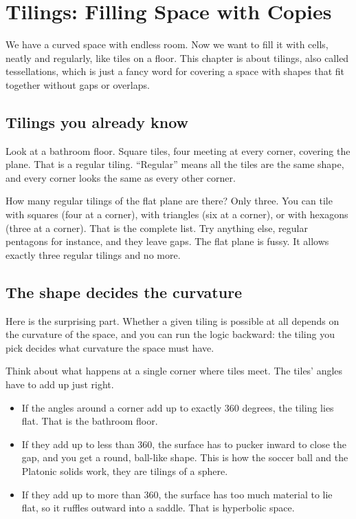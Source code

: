 \section{Tilings: Filling Space with Copies}

We have a curved space with endless room. Now we want to fill it with cells, neatly and regularly, like tiles on a floor. This chapter is about tilings, also called tessellations, which is just a fancy word for covering a space with shapes that fit together without gaps or overlaps.

\subsection{Tilings you already know}

Look at a bathroom floor. Square tiles, four meeting at every corner, covering the plane. That is a regular tiling. ``Regular'' means all the tiles are the same shape, and every corner looks the same as every other corner.

How many regular tilings of the flat plane are there? Only three. You can tile with squares (four at a corner), with triangles (six at a corner), or with hexagons (three at a corner). That is the complete list. Try anything else, regular pentagons for instance, and they leave gaps. The flat plane is fussy. It allows exactly three regular tilings and no more.

\subsection{The shape decides the curvature}

Here is the surprising part. Whether a given tiling is possible at all depends on the curvature of the space, and you can run the logic backward: the tiling you pick decides what curvature the space must have.

Think about what happens at a single corner where tiles meet. The tiles' angles have to add up just right.

\begin{itemize}
\item If the angles around a corner add up to exactly 360 degrees, the tiling lies flat. That is the bathroom floor.
\item If they add up to less than 360, the surface has to pucker inward to close the gap, and you get a round, ball-like shape. This is how the soccer ball and the Platonic solids work, they are tilings of a sphere.
\item If they add up to more than 360, the surface has too much material to lie flat, so it ruffles outward into a saddle. That is hyperbolic space.
\end{itemize}


